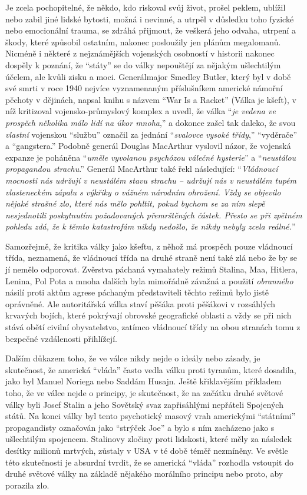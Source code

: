 \documentclass{book}
\begin{document}
Je zcela pochopitelné, že někdo, kdo riskoval svůj život, prošel peklem, ublížil nebo zabil jiné lidské bytosti, možná i nevinné, a utrpěl v důsledku toho fyzické nebo emocionální trauma, se zdráhá přijmout, že veškerá jeho odvaha, utrpení a škody, které způsobil ostatním, nakonec posloužily jen plánům megalomanů. Nicméně i některé z nejznámějších vojenských osobností v historii nakonec dospěly k poznání, že \enquote{státy} se do války nepouštějí za nějakým ušlechtilým účelem, ale kvůli zisku a moci. Generálmajor Smedley Butler, který byl v době své smrti v roce 1940 nejvíce vyznamenaným příslušníkem americké námořní pěchoty v dějinách, napsal knihu s názvem \enquote{War Is a Racket} (Válka je kšeft), v níž kritizoval vojensko-průmyslový komplex a uvedl, že válka \enquote{\emph{je vedena ve prospěch několika málo lidí na úkor mnoha},} a dokonce zašel tak daleko, že svou \emph{vlastní} vojenskou \enquote{službu} označil za jednání \enquote{\emph{svalovce vysoké třídy},} \enquote{vyděrače} a \enquote{gangstera.} Podobně generál Douglas MacArthur vyslovil názor, že vojenská expanze je poháněna \enquote{\emph{uměle vyvolanou psychózou válečné hysterie}} a \enquote{\emph{neustálou propagandou strachu}.} Generál MacArthur také řekl následující: \enquote{\emph{Vládnoucí mocnosti nás udržují v neustálém stavu strachu -- udržují nás v neustálém tupém vlasteneckém zápalu s výkřiky o vážném národním ohrožení. Vždy se objevilo nějaké strašné zlo, které nás mělo pohltit, pokud bychom se za ním slepě nesjednotili poskytnutím požadovaných přemrštěných částek. Přesto se při zpětném pohledu zdá, že k těmto katastrofám nikdy nedošlo, že nikdy nebyly zcela reálné.}}

Samozřejmě, že kritika války jako kšeftu, z něhož má prospěch pouze vládnoucí třída, neznamená, že vládnoucí třída na druhé straně není také zlá nebo že by se jí nemělo odporovat. Zvěrstva páchaná vymahately režimů Stalina, Maa, Hitlera, Lenina, Pol Pota a mnoha dalších byla mimořádně závažná a použití \emph{obranného} násilí proti aktům agrese páchaným představiteli těchto režimů bylo jistě oprávněné. Ale autoritářská válka staví pěšáka proti pěšákovi v rozsáhlých krvavých bojích, které pokrývají obrovské geografické oblasti a vždy se při nich stává obětí civilní obyvatelstvo, zatímco vládnoucí třídy na obou stranách tomu z bezpečné vzdálenosti přihlížejí.

Dalším důkazem toho, že ve válce nikdy nejde o ideály nebo zásady, je skutečnost, že americká \enquote{vláda} často vedla válku proti tyranům, které dosadila, jako byl Manuel Noriega nebo Saddám Husajn. Ještě křiklavějším příkladem toho, že ve válce nejde o principy, je skutečnost, že na začátku druhé světové války byli Josef Stalin a jeho Sovětský svaz zapřisáhlými nepřáteli Spojených států. Na konci války byl tento psychotický masový vrah americkými \enquote{státními} propagandisty označován jako \enquote{strýček Joe} a bylo s ním zacházeno jako s ušlechtilým spojencem. Stalinovy zločiny proti lidskosti, které měly za následek desítky milionů mrtvých, zůstaly v USA v té době téměř nezmíněny. Ve světle této skutečnosti je absurdní tvrdit, že se americká \enquote{vláda} rozhodla vstoupit do druhé světové války na základě nějakého morálního principu nebo proto, aby porazila zlo.
\end{document}
